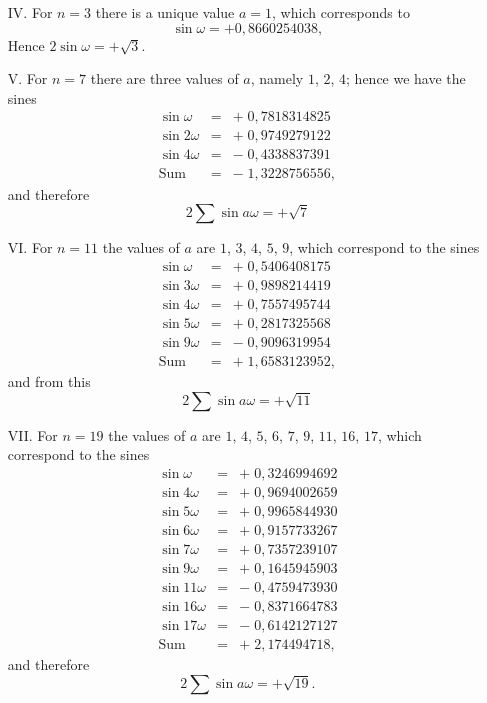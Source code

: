 \documentclass{book}
\theoremstyle{plain}
\theoremstyle{remark}
\begin{document}
\begin{enumerate}
\item[IV.] For $n=3$ there is a unique value $a=1$, which corresponds to 
\[ \sin \omega = +0,8660254038, \]
Hence $2\sin \omega = +\sqrt{3}$.

\item[V.] For $n=7$ there are three values of $a$, namely $1$, $2$, $4$; hence we have the sines
\[ \begin{array}{llr} \sin \omega &=& +\; 0,7818314825\\ 
 \sin 2\omega &=& +\; 0,9749279122 \\ 
 \sin 4 \omega &=& -\;0,4338837391 \\  
 \hline \textrm{Sum} &=& -\; 1,3228756556, \end{array} 
\]
and therefore
\[ 2 \sum \sin a \omega = +\sqrt{7} \]

\item[VI.] For $n=11$ the values of $a$ are $1$, $3$, $4$, $5$, $9$, which correspond to the sines
\[ \begin{array}{llr} \sin \omega &=& +\; 0,5406408175\\ 
 \sin 3\omega &=& +\; 0,9898214419 \\ 
 \sin 4 \omega &=& +\; 0,7557495744 \\  
 \sin 5 \omega &=& +\; 0,2817325568 \\  
 \sin 9 \omega &=& -\; 0,9096319954 \\  
 \hline \textrm{Sum} &=& +\; 1,6583123952, \end{array} \]
and from this 
\[ 2 \sum \sin a \omega = + \sqrt{11} \]

\item[VII.] For $n=19$ the values of $a$ are $1$, $4$, $5$, $6$, $7$, $9$, $11$, $16$, $17$, which correspond to the sines
\[  \begin{array}{llr} \sin \omega &=& +\; 0,3246994692 \\ 
 \sin 4\omega &=& +\; 0,9694002659 \\ 
 \sin 5 \omega &=& +\; 0,9965844930 \\  
 \sin 6 \omega &=& +\; 0,9157733267 \\  
 \sin 7 \omega &=& + \; 0,7357239107 \\  
 \sin 9 \omega &=& +\; 0,1645945903 \\  
 \sin 11 \omega &=& -\; 0,4759473930 \\  
 \sin 16 \omega &=& -\; 0,8371664783\\  
 \sin 17 \omega &=& -\; 0,6142127127 \\  
 \hline \textrm{Sum} &=& +\; 2,174494718, \end{array} \]
and therefore
\[ 2 \sum \sin a \omega = + \sqrt{19}. \]
\end{enumerate}
\end{document}
